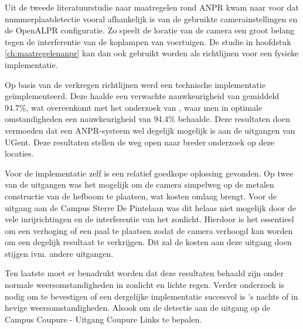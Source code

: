 Uit de tweede literatuurstudie naar maatregelen rond ANPR kwam naar voor dat nummerplaatdetectie vooral afhankelijk is van de gebruikte camerainstellingen en de OpenALPR configuratie. Zo speelt de locatie van de camera een groot belang tegen de interferentie van de koplampen van voertuigen. De studie in hoofdstuk \ref{ch:maatregelenanpr} kan dan ook gebruikt worden als richtlijnen voor een fysieke implementatie.

Op basis van de verkregen richtlijnen werd een technische implementatie geïmplementeerd. Deze haalde een verwachte nauwkeurigheid van gemiddeld 94.7\%, wat overeenkomt met het onderzoek van \textcite{figuerola2016automated}, waar men in optimale omstandigheden een nauwkeurigheid van 94.4\% behaalde. Deze resultaten doen vermoeden dat een ANPR-systeem wel degelijk mogelijk is aan de uitgangen van UGent. Deze resultaten stellen de weg open naar breder onderzoek op deze locaties.

Voor de implementatie zelf is een relatief goedkope oplossing gevonden. Op twee van de uitgangen was het mogelijk om de camera simpelweg op de metalen constructie van de hefboom te plaatsen, wat kosten omlaag brengt. Voor de uitgang aan de Campus Sterre De Pintelaan was dit helaas niet mogelijk door de vele inrijrichtingen en de interferentie van het zonlicht. Hierdoor is het essentieel om een verhoging of een paal te plaatsen zodat de camera verhoogd kan worden om een degelijk resultaat te verkrijgen. Dit zal de kosten aan deze uitgang doen stijgen ivm. andere uitgangen.

Ten laatste moet er benadrukt worden dat deze resultaten behaald zijn onder normale weersomstandigheden in zonlicht en lichte regen. Verder onderzoek is nodig om te bevestigen of een dergelijke implementatie succesvol is 's nachts of in hevige weersomstandigheden. Alsook om de detectie aan de uitgang op de Campus Coupure - Uitgang Coupure Links te bepalen.
